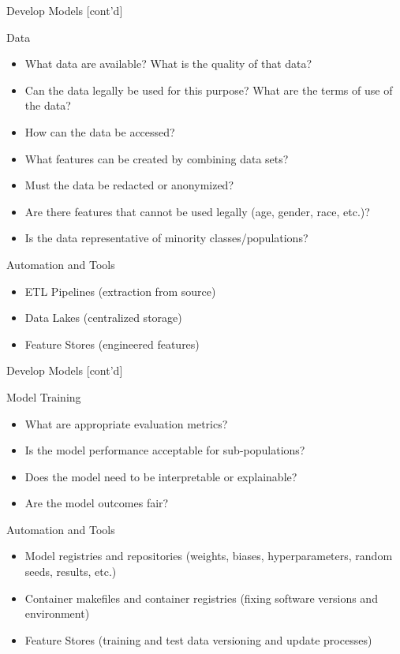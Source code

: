 \documentclass[ignorenonframetext,xcolor=x11names]{beamer}
\begin{document}
\begin{frame}[label=full]{Develop Models \small [cont'd]}
\begin{block}{Data}
\begin{itemize}
   \item What data are available? What is the quality of that data?
   \item Can the data legally be used for this purpose? What are the terms of use of the data?
   \item How can the data be accessed?
   \item What features can be created by combining data sets?
   \item Must the data be redacted or anonymized?
   \item Are there features that cannot be used legally (age, gender, race, etc.)?
   \item Is the data representative of minority classes/populations?
\end{itemize}
\end{block}
\begin{block}{Automation and Tools}
\begin{itemize}
   \item ETL Pipelines (extraction from source)
   \item Data Lakes (centralized storage)
   \item Feature Stores (engineered features)
\end{itemize}
\end{block}
\end{frame}

\begin{frame}[label=full]{Develop Models \small [cont'd]}
\begin{block}{Model Training}
\begin{itemize}
   \item What are appropriate evaluation metrics?
   \item Is the model performance acceptable for sub-populations?
   \item Does the model need to be interpretable or explainable?
   \item Are the model outcomes fair?
\end{itemize}
\end{block}
\begin{block}{Automation and Tools}
\begin{itemize}
   \item Model registries and repositories (weights, biases, hyperparameters, random seeds, results, etc.)
   \item Container makefiles and container registries (fixing software versions and environment)
   \item Feature Stores (training and test data versioning and update processes)
\end{itemize}
\end{block}
\end{frame}
\end{document}
